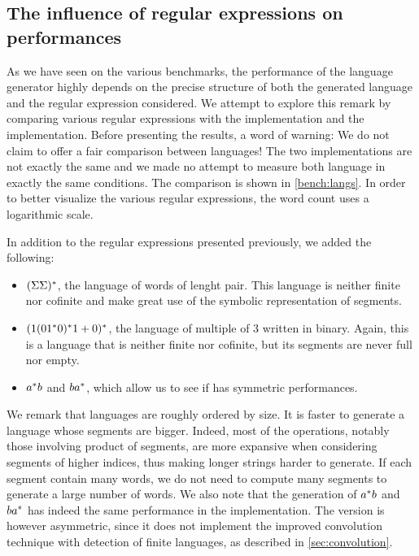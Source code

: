 \subsection{The influence of regular expressions on performances}

As we have seen on the various benchmarks, the performance of the language
generator highly depends on the precise structure of both
the generated language and the regular expression considered.
We attempt to explore this remark by comparing various regular expressions
with the  \haskell implementation and the 
\ocaml implementation.
Before presenting the results, a word of warning:
We do not claim to offer a fair comparison between languages!
The two implementations are not exactly the same and we made no attempt
to measure both language in exactly the same conditions.
The comparison is shown in \cref{bench:langs}. In order to better visualize the
various regular expressions, the word count uses a logarithmic scale.

In addition to the regular expressions presented previously, we added the following:
\begin{itemize}
\item $(\Sigma\Sigma)^*$, the language of words of lenght pair. This language
  is neither finite nor cofinite and make great use of the symbolic
  representation of segments.
\item $(1 (01^*0)^*1 +{0})^*$, the language
  of multiple of 3 written in binary. Again, this is a language that is neither
  finite nor cofinite, but its segments are never full nor empty.
\item $a^*b$ and $ba^*$, which allow us to see if
   has symmetric performances.
\end{itemize}

We remark that languages are roughly ordered by size. It is faster
to generate a language whose segments are bigger. Indeed,
most of the operations, notably
those involving product of segments, are more expansive when considering
segments of higher indices, thus making longer strings harder to generate.
If each segment contain many words, we do not need to compute many segments to
generate a large number of words.
%
We also note that the generation of $a^*b$ and $ba^*$
has indeed the same performance in the \haskell implementation.
The \ocaml version is however asymmetric, since it does not implement
the improved convolution technique with
detection of finite languages, as described in \cref{sec:convolution}.



